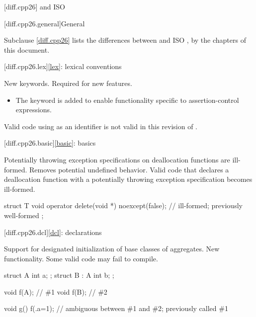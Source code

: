 
[diff.cpp26]{\Cpp{} and ISO \CppXXVI{}}

[diff.cpp26.general]{General}

\pnum
{}%
Subclause \ref{diff.cpp26} lists the differences between \Cpp{} and
ISO \CppXXVI{},
by the chapters of this document.

[diff.cpp26.lex]{\ref*{lex}: lexical conventions}

\change
New keywords.
\rationale
Required for new features.
\begin{itemize}
\item
The  keyword
is added to enable functionality specific to
assertion-control expressions.
\end{itemize}
\effect
Valid \CppXXVI{} code using  as an identifier
is not valid in this revision of \Cpp{}.

[diff.cpp26.basic]{\ref*{basic}: basics}

\change
Potentially throwing exception specifications
on deallocation functions are ill-formed.
\rationale
Removes potential undefined behavior.
\effect
Valid \CppXXVI{} code that declares a deallocation function
with a potentially throwing exception specification
becomes ill-formed.
\begin{example}
\begin{codeblock}
struct T {
  void operator delete(void *) noexcept(false);         // ill-formed; previously well-formed
};
\end{codeblock}
\end{example}

[diff.cpp26.dcl]{\ref*{dcl}: declarations}

\change
Support for designated initialization of base classes of aggregates.
\rationale
New functionality.
\effect
Some valid \CppXXVI{} code may fail to compile.
\begin{example}
\begin{codeblock}
struct A { int a; };
struct B : A { int b; };

void f(A);              // \#1
void f(B);              // \#2

void g() {
  f({.a=1});            // ambiguous between \#1 and \#2; previously called \#1
}
\end{codeblock}
\end{example}

